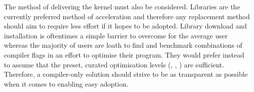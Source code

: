 \documentclass[\main/thesis.tex]{subfiles}
\begin{document}
The method of delivering the kernel must also be considered.
Libraries are the currently preferred method of acceleration and therefore any replacement method should aim to require less effort if it hopes to be adopted.
Library download and installation is oftentimes a simple barrier to overcome for the average user whereas the majority of users are loath to find and benchmark combinations of compiler flags in an effort to optimise their program.
They would prefer instead to assume that the preset, curated optimisation levels (\ie {}, , ) are sufficient.
Therefore, a compiler-only solution should strive to be as transparent as possible when it comes to enabling easy adoption.

\end{document}

